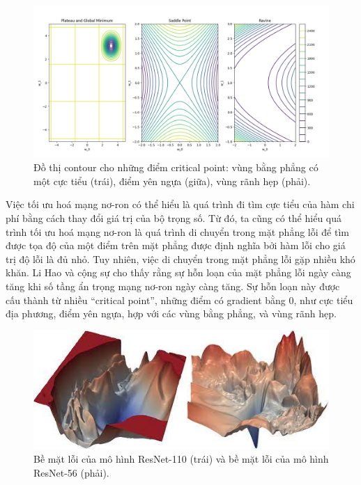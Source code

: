 \begin{figure}[htp]
\centering
\includegraphics[width=120 mm]{images/cricial-point-contour.png}
\caption{Đồ thị contour cho những điểm critical point: vùng bằng phẳng có một cực tiểu (trái), điểm yên ngựa (giữa), vùng rãnh hẹp (phải).}
\label{fig:cricial-point-contour}
\end{figure}

Việc tối ưu hoá mạng nơ-ron có thể hiểu là quá trình đi tìm cực tiểu của hàm chi phí bằng cách thay đổi giá trị của bộ trọng số. Từ đó, ta cũng có thể hiểu quá trình tối ưu hoá mạng nơ-ron là quá trình di chuyển trong mặt phẳng lỗi để tìm được tọa độ của một điểm trên mặt phẳng được định nghĩa bởi hàm lỗi cho giá trị độ lỗi là đủ nhỏ. Tuy nhiên, việc di chuyển trong mặt phẳng lỗi gặp nhiều khó khăn. Li Hao và cộng sự \cite{li2018visualizing} cho thấy rằng sự hỗn loạn của mặt phẳng lỗi ngày càng tăng khi số tầng ẩn trọng mạng nơ-ron ngày càng tăng. Sự hỗn loạn này được cấu thành từ nhiều ``critical point'', những điểm có gradient bằng 0, như cực tiểu địa phương, điểm yên ngựa, hợp với các vùng bằng phẳng, và vùng rãnh hẹp.

\begin{figure}[htp]
\centering
\includegraphics[width=120 mm]{images/resnet-loss.png}
\caption{Bề mặt lỗi của mô hình ResNet-110 (trái) và bề mặt lỗi của mô hình ResNet-56 (phải).\cite{li2018visualizing}}
\label{fig:resnet-loss}
\end{figure}

